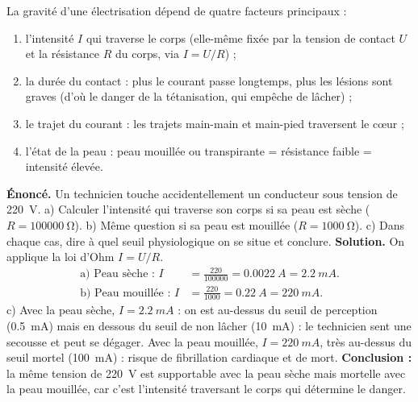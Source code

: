 \documentclass[11pt]{article}
\newcommand{\cle}[1]{{\popxbold\color{popdark}#1}}
\begin{document}
\begin{propriete}
La gravité d'une électrisation dépend de quatre facteurs principaux :
\begin{enumerate}
\item l'\cle{intensité} $I$ qui traverse le corps (elle-même fixée par la tension de contact $U$ et la résistance $R$ du corps, via $I = U/R$) ;
\item la \cle{durée du contact} : plus le courant passe longtemps, plus les lésions sont graves (d'où le danger de la tétanisation, qui empêche de lâcher) ;
\item le \cle{trajet du courant} : les trajets main-main et main-pied traversent le cœur ;
\item l'\cle{état de la peau} : peau mouillée ou transpirante = résistance faible = intensité élevée.
\end{enumerate}
\end{propriete}

\begin{exoresolu}
\textbf{Énoncé.} Un technicien touche accidentellement un conducteur sous tension de \SI{220}{V}. a) Calculer l'intensité qui traverse son corps si sa peau est sèche ($R = \SI{100000}{\ohm}$). b) Même question si sa peau est mouillée ($R = \SI{1000}{\ohm}$). c) Dans chaque cas, dire à quel seuil physiologique on se situe et conclure.
\tcblower
\textbf{Solution.} On applique la loi d'Ohm $I = U/R$.
\begin{align*}
\text{a) Peau sèche : } I &= \frac{220}{100000} = \SI{0,0022}{A} = \SI{2,2}{mA}.\\
\text{b) Peau mouillée : } I &= \frac{220}{1000} = \SI{0,22}{A} = \SI{220}{mA}.
\end{align*}
c) Avec la peau sèche, $I = \SI{2,2}{mA}$ : on est au-dessus du seuil de perception (\SI{0,5}{mA}) mais en dessous du seuil de non lâcher (\SI{10}{mA}) : le technicien sent une secousse et peut se dégager. Avec la peau mouillée, $I = \SI{220}{mA}$, très au-dessus du seuil mortel (\SI{100}{mA}) : risque de fibrillation cardiaque et de mort. \textbf{Conclusion :} la même tension de \SI{220}{V} est supportable avec la peau sèche mais mortelle avec la peau mouillée, car c'est l'intensité traversant le corps qui détermine le danger.
\end{exoresolu}
\end{document}
